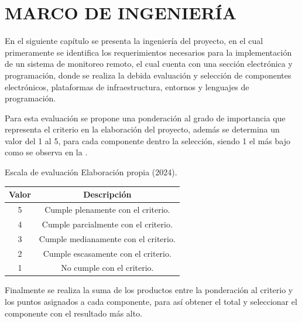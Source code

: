 
\newpage

%
%



\section{MARCO DE INGENIERÍA}
En el siguiente capítulo se presenta la ingeniería del proyecto, en el cual primeramente se identifica los requerimientos necesarios para la implementación de un sistema de monitoreo remoto, el cual cuenta con una sección electrónica y programación, donde se realiza la debida evaluación y selección de componentes electrónicos, plataformas de infraestructura, entornos y lenguajes de programación.

Para esta evaluación se propone una ponderación al grado de importancia que representa el criterio en la elaboración del proyecto, además se determina un valor del 1 al 5, para cada componente dentro la selección, siendo 1 el más bajo como se observa en la .

\begin{tabla}[val]
{Escala de evaluación}
{Elaboración propia (2024).}
\centering
\resizebox{9cm}{!} 
{
\begin{tabular}{|c|c|} 
\hline
\rowcolor[rgb]{0.678,0.702,0.698} Valor & Descripción                           \\ 
\hline
5                                       & Cumple plenamente con el criterio.    \\
\hline
4                                       & Cumple parcialmente con el criterio.  \\
\hline
3                                       & Cumple medianamente con el criterio.  \\ 
\hline
2                                       & Cumple escasamente con el criterio.   \\ 
\hline
1                                       & No cumple con el criterio.            \\ 
\hline
\end{tabular}
}
\end{tabla}


Finalmente se realiza la suma de los productos entre la ponderación al criterio y los puntos asignados a cada componente, para así obtener el total y seleccionar el componente con el resultado más alto.

